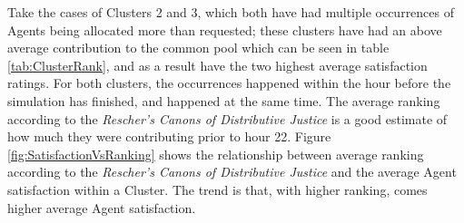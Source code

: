 Take the cases of Clusters 2 and 3, which both have had multiple occurrences of Agents being allocated more than requested; these clusters have had an above average contribution to the common pool which can be seen in table \ref{tab:ClusterRank}, and as a result have the two highest average satisfaction ratings. For both clusters, the occurrences happened within the hour before the simulation has finished, and happened at the same time. The average ranking according to the \textit{Rescher's Canons of Distributive Justice} is a good estimate of how much they were contributing prior to hour 22. Figure \ref{fig:SatisfactionVsRanking} shows the relationship between average ranking according to the \textit{Rescher's Canons of Distributive Justice} and the average Agent satisfaction within a Cluster. The trend is that, with higher ranking, comes higher average Agent satisfaction.

